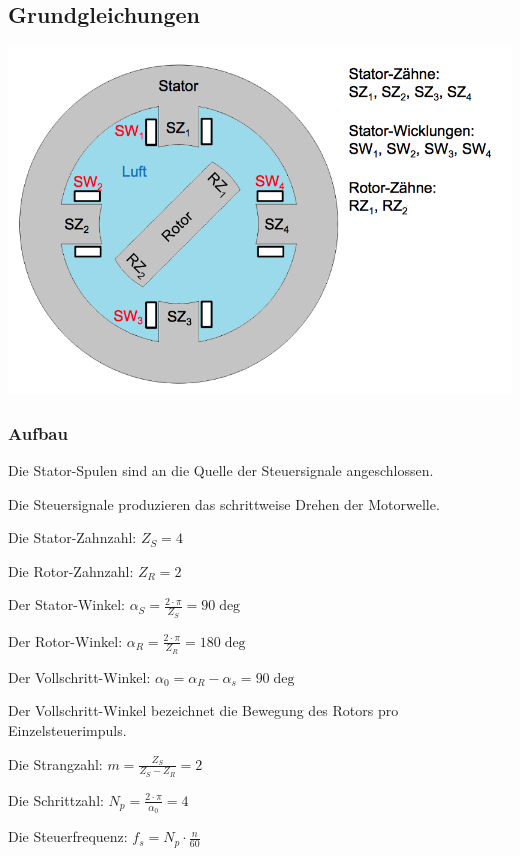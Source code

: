 \subsection{Grundgleichungen}
\begin{minipage}{0.5 \linewidth}
\includegraphics[width = \linewidth]{./Pics/VL67/AufbauRe}
\end{minipage}
\begin{minipage}{0.5 \linewidth}
\subsubsection{Aufbau}
\begin{compactitem}
\item Die Stator-Spulen sind an die Quelle der Steuersignale angeschlossen.
\item Die Steuersignale produzieren das schrittweise Drehen der Motorwelle.
\item Die Stator-Zahnzahl: $Z_S = 4$
\item Die Rotor-Zahnzahl: $Z_R = 2$
\item Der Stator-Winkel: $\alpha_S = \frac{2\cdot \pi}{Z_S} = 90 \deg$
\item Der Rotor-Winkel: $\alpha_R =  \frac{2\cdot \pi}{Z_R} = 180 \deg$
\item Der Vollschritt-Winkel: $\alpha_0 = \alpha_R - \alpha_s = 90 \deg$ 
\item Der Vollschritt-Winkel bezeichnet die Bewegung des Rotors pro Einzelsteuerimpuls.
\item Die Strangzahl: $m = \frac{Z_S}{Z_S - Z_R} = 2$
\item Die Schrittzahl: $N_p = \frac{2\cdot \pi}{\alpha_0} = 4$
\item Die Steuerfrequenz: $f_s = N_p \cdot \frac{n}{60}$ 
\end{compactitem}
\end{minipage}

